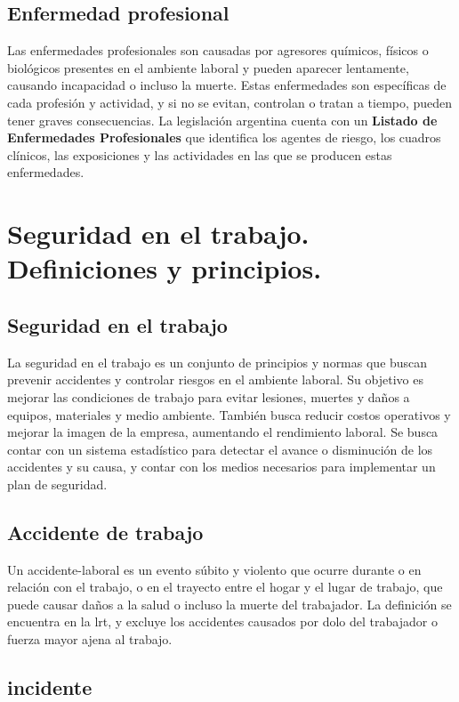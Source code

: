 \subsection{Enfermedad profesional}

Las enfermedades profesionales son causadas por agresores químicos, físicos o
biológicos presentes en el ambiente laboral y pueden aparecer lentamente,
causando incapacidad o incluso la muerte. Estas enfermedades son específicas de
cada profesión y actividad, y si no se evitan, controlan o tratan a tiempo,
pueden tener graves consecuencias. La legislación argentina cuenta con un
\textbf{Listado de Enfermedades Profesionales} que identifica los agentes de
riesgo, los cuadros clínicos, las exposiciones y las actividades en las que se
producen estas enfermedades.

\section{Seguridad en el trabajo. Definiciones y principios.}

\subsection{Seguridad en el trabajo}

La seguridad en el trabajo es un conjunto de principios y normas que buscan
prevenir accidentes y controlar riesgos en el ambiente laboral. Su objetivo es
mejorar las condiciones de trabajo para evitar lesiones, muertes y daños a
equipos, materiales y medio ambiente. También busca reducir costos operativos y
mejorar la imagen de la empresa, aumentando el rendimiento laboral. Se busca
contar con un sistema estadístico para detectar el avance o disminución de los
accidentes y su causa, y contar con los medios necesarios para implementar un
plan de seguridad.

\subsection{Accidente de trabajo}

Un \gls{accidente-laboral} es un evento súbito y violento que ocurre durante
o en relación con el trabajo, o en el trayecto entre el hogar y el lugar de 
trabajo, que puede causar daños a la salud o incluso la muerte del trabajador.
La definición se encuentra en la \acrfull{lrt}, y excluye los accidentes
causados por dolo del trabajador o fuerza mayor ajena al trabajo.

\subsection{\Gls{incidente}}

